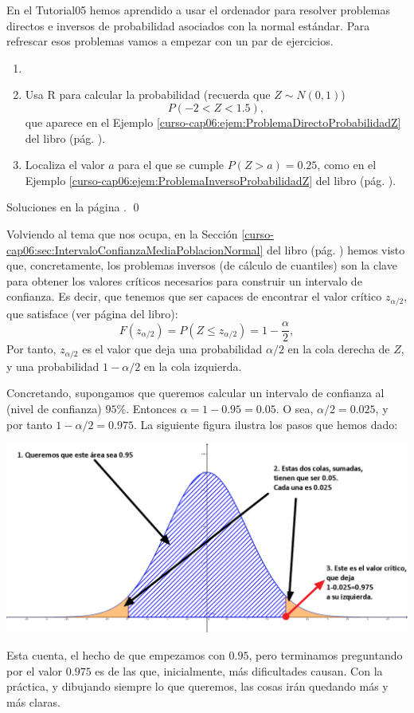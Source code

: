 \documentclass[10pt,a4paper]{article}\usepackage[]{graphicx}\usepackage[]{color}
\newcounter {cont01}
\begin{document}
En el Tutorial05 hemos aprendido a usar el ordenador para resolver problemas directos e inversos de probabilidad asociados con la normal estándar. Para refrescar esos problemas vamos a empezar con un par de ejercicios.
\begin{ejercicio}
\label{tut06:ejercicio05}
\begin{enumerate}
  \item[]
  \item Usa R para calcular la probabilidad (recuerda que $Z\sim N(0,1)$)
    \[P(-2 < Z < 1.5),\]
    que aparece en el Ejemplo \ref{curso-cap06:ejem:ProblemaDirectoProbabilidadZ} del libro (pág. \pageref{curso-cap06:ejem:ProblemaDirectoProbabilidadZ}).
  \item Localiza el valor $a$ para el que se cumple $P(Z>a)=0.25$, como en el Ejemplo \ref{curso-cap06:ejem:ProblemaInversoProbabilidadZ} del libro (pág. \pageref{curso-cap06:ejem:ProblemaInversoProbabilidadZ}).
\end{enumerate}
Soluciones en la página \pageref{tut06:ejercicio05:sol}.
\qed
\end{ejercicio}
Volviendo al tema que nos ocupa, en la Sección \ref{curso-cap06:sec:IntervaloConfianzaMediaPoblacionNormal} del libro (pág. \pageref{curso-cap06:sec:IntervaloConfianzaMediaPoblacionNormal}) hemos visto que, concretamente, los problemas inversos (de cálculo de cuantiles) son la clave para obtener los valores críticos necesarios para construir un intervalo de confianza. Es decir, que tenemos que ser capaces de encontrar el valor crítico $z_{\alpha/2}$, que satisface (ver página \pageref{curso-cap06:ecu:DefinicionValorCriticoZ} del libro):
       \[F\left(z_{\alpha/2}\right)=P\left(Z\leq z_{\alpha/2}\right)=1-\dfrac{\alpha}{2},\]
Por tanto, $z_{\alpha/2}$ es el valor que deja una probabilidad $\alpha/2$ en la cola derecha de $Z$, y una probabilidad $1-\alpha/2$ en la cola izquierda.

Concretando, supongamos que queremos calcular un intervalo de confianza al (nivel de confianza) $95\%$. Entonces $\alpha=1-0.95=0.05$. O sea, $\alpha/2=0.025$, y por tanto $1-\alpha/2=0.975$.
La siguiente figura ilustra los pasos que hemos dado:
    \begin{center}
    \includegraphics[width=16cm]{../fig/Tut06-08-IntervaloConfianzaz.png}
    \end{center}
Esta cuenta, el hecho de que empezamos con $0.95$, pero terminamos preguntando por el valor $0.975$ es de las que, inicialmente, más dificultades causan. Con la práctica, y dibujando siempre lo que queremos, las cosas irán quedando más y más claras.
\end{document}
